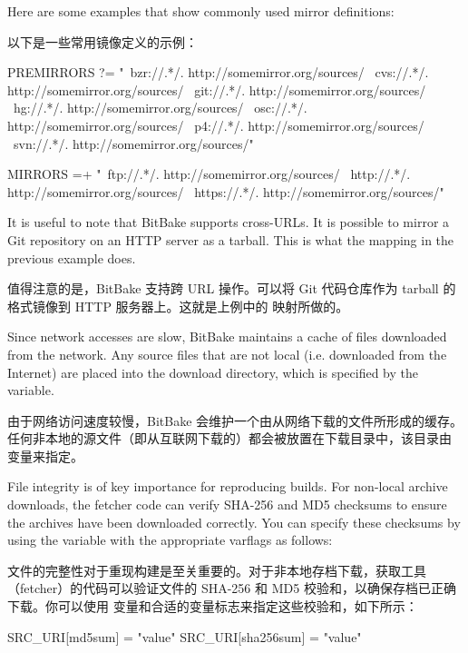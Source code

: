 Here are some examples that show commonly used mirror definitions:

以下是一些常用镜像定义的示例：

\begin{pyglist}
PREMIRRORS ?= "\
   bzr://.*/.\*  http://somemirror.org/sources/ \
   cvs://.*/.\*  http://somemirror.org/sources/ \
   git://.*/.\*  http://somemirror.org/sources/ \
   hg://.*/.\*   http://somemirror.org/sources/ \
   osc://.*/.\*  http://somemirror.org/sources/ \
   p4://.*/.\*   http://somemirror.org/sources/ \
  svn://.*/.\*   http://somemirror.org/sources/"

MIRRORS =+ "\
   ftp://.*/.\*   http://somemirror.org/sources/ \
   http://.*/.\*  http://somemirror.org/sources/ \
   https://.*/.\* http://somemirror.org/sources/"
\end{pyglist}

It is useful to note that BitBake supports cross-URLs. It is possible to mirror a Git repository on an HTTP server as a tarball. This is what the  mapping in the previous example does.

值得注意的是，BitBake 支持跨 URL 操作。可以将 Git 代码仓库作为 tarball 的格式镜像到 HTTP 服务器上。这就是上例中的  映射所做的。

Since network accesses are slow, BitBake maintains a cache of files downloaded from the network. Any source files that are not local (i.e. downloaded from the Internet) are placed into the download directory, which is specified by the  variable.

由于网络访问速度较慢，BitBake 会维护一个由从网络下载的文件所形成的缓存。任何非本地的源文件（即从互联网下载的）都会被放置在下载目录中，该目录由  变量来指定。

File integrity is of key importance for reproducing builds. For non-local archive downloads, the fetcher code can verify SHA-256 and MD5 checksums to ensure the archives have been downloaded correctly. You can specify these checksums by using the  variable with the appropriate varflags as follows:

文件的完整性对于重现构建是至关重要的。对于非本地存档下载，获取工具（fetcher）的代码可以验证文件的 SHA-256 和 MD5 校验和，以确保存档已正确下载。你可以使用 \bbgls{SRC_URI} 变量和合适的变量标志来指定这些校验和，如下所示：

\begin{pyglist}
SRC_URI[md5sum] = "value"
SRC_URI[sha256sum] = "value"
\end{pyglist}

